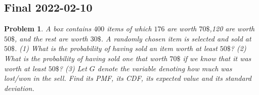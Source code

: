 \documentclass[a4paper, 12pt]{article}
\newtheorem{problem}{Problem}
\newtheorem{problem}{Problem}
\begin{document}
\normalsize

\pagebreak 

\subsection{Final 2022-02-10}

\begin{problem}
    A box contains $400$ items of which $176$ are worth $70\$$,120 are worth
    $50\$$, and the rest are worth $30\$$. A randomly chosen item is selected
    and sold at $50\$$. \textit{(1)} What is the probability of having sold an
    item worth at least $50\$$? \textit{(2)} What is the probability of having
    sold one that worth $70\$$ if we know that it was worth \textit{at least}
    $50\$$? \textit{(3)} Let $G$ denote the variable denoting how much
    was lost/won in the sell. Find its PMF, its CDF, its expected value and its
    standard deviation.
\end{problem}
\end{document}
